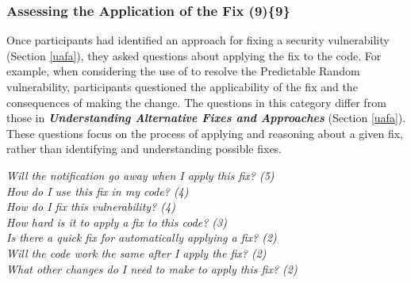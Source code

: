 \documentclass{acm_proc_article-sp}
\begin{document}











\subsubsection{\textbf{Assessing the Application of the Fix (9)\{9\}}}\label{aaf}
Once participants had identified an approach for fixing a security vulnerability (Section \ref{uafa}), they asked questions about applying the fix to the code.
For example, when considering the use of  to resolve the Predictable Random vulnerability, participants questioned the applicability of the fix and the consequences of making the change. 
The questions in this category differ from those in \emph{\textbf{Understanding Alternative Fixes and Approaches}} (Section \ref{uafa}). 
These questions focus on the process of applying  and reasoning about a given fix, rather than identifying and understanding possible fixes.


\noindent\emph{Will the notification go away when I apply this fix? (5)} \\
\emph{How do I use this fix in my code? (4)} \\
\emph{How do I fix this vulnerability? (4)} \\
\emph{How hard is it to apply a fix to this code? (3)} \\
\emph{Is there a quick fix for automatically applying a fix? (2)} \\
\emph{Will the code work the same after I apply the fix? (2)} \\
\emph{What other changes do I need to make to apply this fix? (2)} 
\end{document}
